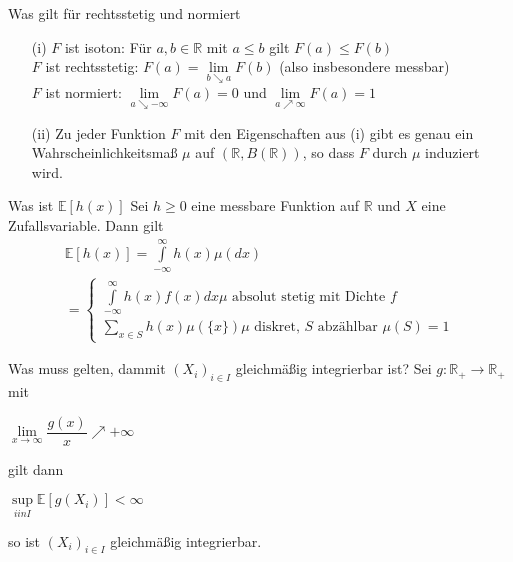 \documentclass[avery5371,grid,frame]{flashcards} %
\newcommand{\E}{\mathbb{E}}
\newcommand{\R}{\mathbb{R}}
\newcommand{\1}{ \mathbb{1} } %
\begin{document}
\begin{flashcard}[Satz]{Was gilt für rechtsstetig und normiert}
  \begin{itemize}
  \item[(i)] $F$ ist isoton: Für $a,b \in \R$ mit $a \leq b$ gilt $F(a)\leq F(b)$\\
    $F$ ist rechtsstetig: $F(a)=\lim\limits_{b\searrow a}F(b)$ (also insbesondere messbar)\\
    $F$ ist normiert: $\lim\limits_{a\searrow -\infty}F(a)=0$ und
    $\lim\limits_{a\nearrow \infty}F(a)=1$
  \item[(ii)] Zu jeder Funktion $F$ mit den Eigenschaften aus (i) gibt
    es genau ein Wahrscheinlichkeitsmaß $\mu$ auf $(\R,B(\R))$, so dass $F$ durch $\mu$
    induziert wird.
  \end{itemize}
\end{flashcard}

\begin{flashcard}[Satz]{Was ist $\E[h(x)]$}
\small  Sei $h\geq 0$ eine messbare Funktion auf $\R$ und $X$ eine Zufallsvariable. Dann
  gilt
  \begin{eqnarray*}
    \E[h(x)] = \int\limits_{-\infty}^{\infty} h(x) \mu(dx)\\
    = \begin{cases}
      \int\limits_{-\infty}^\infty h(x)f(x) dx  \mu \text{ absolut stetig mit Dichte } f\\
      \sum\limits_{x \in S} h(x)\mu(\{x\})  \mu \text{ diskret, } S \text{ abzählbar } \mu(S)=1
    \end{cases}
  \end{eqnarray*}
\end{flashcard}

\begin{flashcard}[Satz]{Was muss gelten, dammit $(X_i)_{i \in I}$ gleichmäßig integrierbar ist?}
  Sei $g:\R_+ \to \R_+$ mit
  \begin{center}
    $\lim\limits_{x\to \infty} \dfrac{g(x)}{x}\nearrow +\infty$
  \end{center}
  gilt dann
  \begin{center}
    $\sup\limits_{i in I} \E[g(X_i)]<\infty$
  \end{center}
  so ist $(X_i)_{i \in I}$ gleichmäßig integrierbar.
\end{flashcard}
\end{document}

